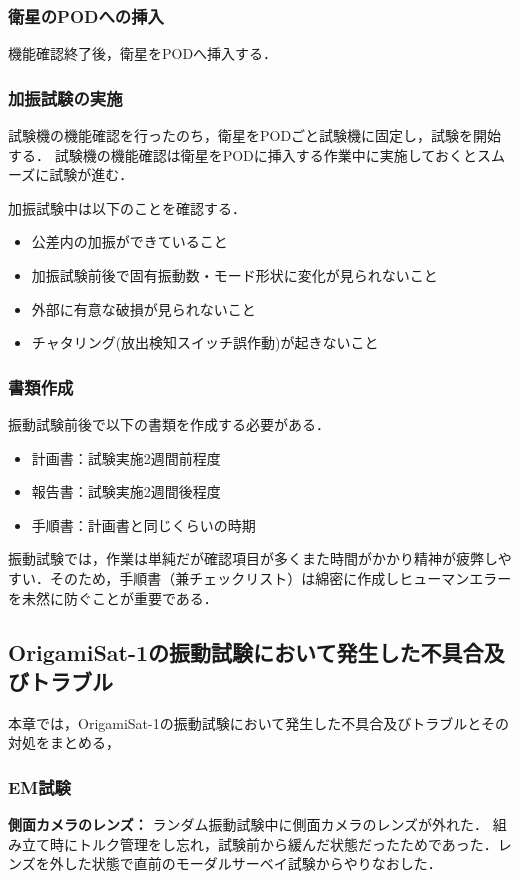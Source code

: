 \subsubsection{衛星のPODへの挿入}
機能確認終了後，衛星をPODへ挿入する．

\subsubsection{加振試験の実施}
試験機の機能確認を行ったのち，衛星をPODごと試験機に固定し，試験を開始する．
試験機の機能確認は衛星をPODに挿入する作業中に実施しておくとスムーズに試験が進む．\par

加振試験中は以下のことを確認する．
\begin{itemize}
	\item 公差内の加振ができていること
	\item 加振試験前後で固有振動数・モード形状に変化が見られないこと
	\item 外部に有意な破損が見られないこと
	\item チャタリング(放出検知スイッチ誤作動)が起きないこと
\end{itemize}

\subsubsection{書類作成}
振動試験前後で以下の書類を作成する必要がある．
\begin{itemize}
	\item 計画書：試験実施2週間前程度
	\item 報告書：試験実施2週間後程度
	\item 手順書：計画書と同じくらいの時期
\end{itemize}
振動試験では，作業は単純だが確認項目が多くまた時間がかかり精神が疲弊しやすい．そのため，手順書（兼チェックリスト）は綿密に作成しヒューマンエラーを未然に防ぐことが重要である．

\subsection{OrigamiSat-1の振動試験において発生した不具合及びトラブル}
本章では，OrigamiSat-1の振動試験において発生した不具合及びトラブルとその対処をまとめる，

\subsubsection{EM試験}
\textbf{側面カメラのレンズ：}
ランダム振動試験中に側面カメラのレンズが外れた．
組み立て時にトルク管理をし忘れ，試験前から緩んだ状態だったためであった．レンズを外した状態で直前のモーダルサーベイ試験からやりなおした．

